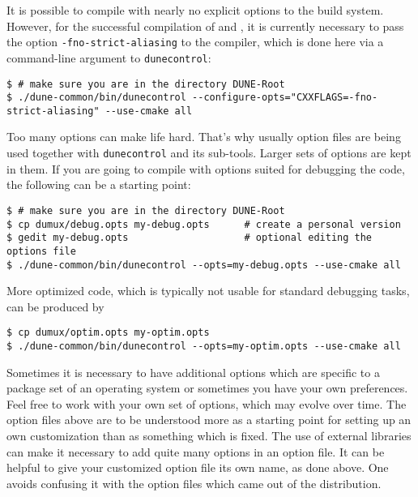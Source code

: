 It is possible to compile \Dumux with nearly no explicit options to the build system.
However, for the successful compilation of \Dune and \Dumux, it is currently necessary to pass
the option \texttt{-fno-strict-aliasing} to the \Cplusplus compiler,
which is done here via a command-line argument to \texttt{dunecontrol}:
\begin{lstlisting}[style=Bash]
$ # make sure you are in the directory DUNE-Root
$ ./dune-common/bin/dunecontrol --configure-opts="CXXFLAGS=-fno-strict-aliasing" --use-cmake all
\end{lstlisting}

Too many options can make life hard. That's why usually option files are being used together with \texttt{dunecontrol} and its sub-tools.
Larger sets of options are kept in them. If you are going to compile with options suited for debugging the code, the following
can be a starting point:
\begin{lstlisting}[style=Bash]
$ # make sure you are in the directory DUNE-Root
$ cp dumux/debug.opts my-debug.opts      # create a personal version
$ gedit my-debug.opts                    # optional editing the options file
$ ./dune-common/bin/dunecontrol --opts=my-debug.opts --use-cmake all
\end{lstlisting}

More optimized code, which is typically not usable for standard debugging tasks, can be produced by
\begin{lstlisting}[style=Bash]
$ cp dumux/optim.opts my-optim.opts
$ ./dune-common/bin/dunecontrol --opts=my-optim.opts --use-cmake all
\end{lstlisting}

Sometimes it is necessary to have additional options which
are specific to a package set of an operating system or
sometimes you have your own preferences.
Feel free to work with your own set of options, which may evolve over time.
The option files above are to be understood more as a starting point
for setting up an own customization than as something which is fixed.
The use of external libraries can make it necessary to add quite many options in an option file.
It can be helpful to give your customized option file its own name, as done above.
One avoids confusing it with the option files which came out of the distribution.

